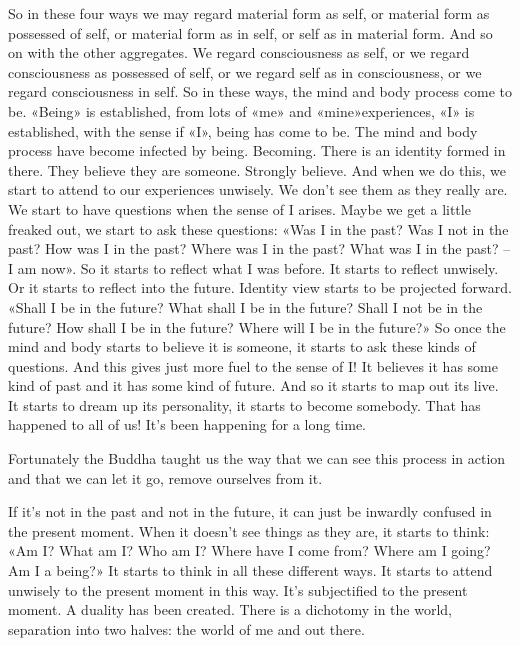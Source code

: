 \documentclass[letterpaper,10pt,english]{sphinxmanual}
\begin{document}
\sphinxAtStartPar
So in these four ways we may regard material form as self, or material
form  as  possessed  of  self,  or  material  form  as  in  self,  or  self  as  in  material  form. And  so  on  with  the  other  aggregates.  We  regard  consciousness
as self, or we regard consciousness as possessed of self, or we regard self
as in consciousness, or we regard consciousness in self. So in these ways,
the  mind  and  body  process  come  to  be.  «Being»  is  established,  from  lots
of «me»\sphinxhyphen{} and «mine»\sphinxhyphen{}experiences, «I» is established, with the sense if «I»,
being has come to be. The mind and body process have become infected by
being. Becoming. There is an identity formed in there. They believe they are
someone. Strongly believe. And when we do this, we start to attend to our
experiences unwisely. We don’t see them as they really are. We start to have
questions when the sense of I arises. Maybe we get a little freaked out, we
start to ask these questions: «Was I in the past? Was I not in the past? How
was I in the past? Where was I in the past? What was I in the past? – I am
now». So it starts to reflect what I was before. It starts to reflect unwisely. Or
it starts to reflect into the future. Identity view starts to be projected forward.
«Shall I be in the future? What shall I be in the future? Shall I not be in the
future? How shall I be in the future? Where will I be in the future?» So once
the mind and body starts to believe it is someone, it starts to ask these kinds
of questions. And this gives just more fuel to the sense of I! It believes it has
some kind of past and it has some kind of future. And so it starts to map out
its live. It starts to dream up its personality, it starts to become somebody.
  That has happened to all of us! It’s been happening for a long time.

\sphinxAtStartPar
Fortunately the Buddha taught us the way that we can see this process
in action and that we can let it go, remove ourselves from it.

\sphinxAtStartPar
If it’s not in the past and not in the future, it can just be inwardly confused in the present moment. When it doesn’t see things as they are, it starts
to think: «Am I? What am I? Who am I? Where have I come from? Where
am I going? Am I a being?» It starts to think in all these different ways. It
starts to attend unwisely to the present moment in this way. It’s subjectified
to the present moment. A duality has been created. There is a dichotomy in
the world, separation into two halves: the world of me and out there.
\end{document}
